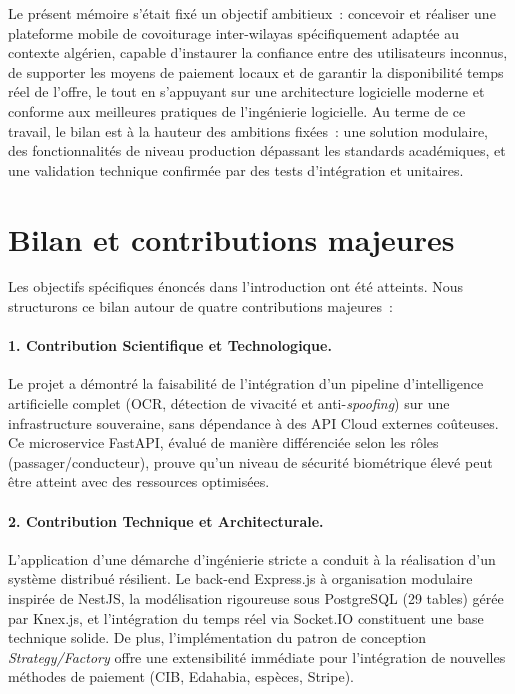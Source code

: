 
Le présent mémoire s'était fixé un objectif ambitieux~: concevoir et réaliser une plateforme mobile de covoiturage inter-wilayas spécifiquement adaptée au contexte algérien, capable d'instaurer la confiance entre des utilisateurs inconnus, de supporter les moyens de paiement locaux et de garantir la disponibilité temps réel de l'offre, le tout en s'appuyant sur une architecture logicielle moderne et conforme aux meilleures pratiques de l'ingénierie logicielle. Au terme de ce travail, le bilan est à la hauteur des ambitions fixées~: une solution modulaire, des fonctionnalités de niveau production dépassant les standards académiques, et une validation technique confirmée par des tests d'intégration et unitaires.

\section*{Bilan et contributions majeures}

Les objectifs spécifiques énoncés dans l'introduction ont été atteints. Nous structurons ce bilan autour de quatre contributions majeures~:

\paragraph{1. Contribution Scientifique et Technologique.} 
Le projet a démontré la faisabilité de l'intégration d'un pipeline d'intelligence artificielle complet (OCR, détection de vivacité et anti-\textit{spoofing}) sur une infrastructure souveraine, sans dépendance à des API Cloud externes coûteuses. Ce microservice FastAPI, évalué de manière différenciée selon les rôles (passager/conducteur), prouve qu'un niveau de sécurité biométrique élevé peut être atteint avec des ressources optimisées.

\paragraph{2. Contribution Technique et Architecturale.} 
L'application d'une démarche d'ingénierie stricte a conduit à la réalisation d'un système distribué résilient. Le back-end Express.js à organisation modulaire inspirée de NestJS, la modélisation rigoureuse sous PostgreSQL (29 tables) gérée par Knex.js, et l'intégration du temps réel via Socket.IO constituent une base technique solide. De plus, l'implémentation du patron de conception \textit{Strategy/Factory} offre une extensibilité immédiate pour l'intégration de nouvelles méthodes de paiement (CIB, Edahabia, espèces, Stripe).

